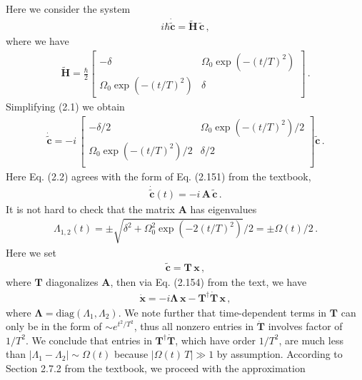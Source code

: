 \documentclass[11pt, oneside]{book}
\theoremstyle{break}
\theoremstyle{break}
\newcommand{\that}[1]{\widetilde{#1}}
\newcommand{\bmat}[1]{\begin{bmatrix} #1 \end{bmatrix}}
\begin{document}
\chapter{}
Here we consider the system
\begin{align}
i\hbar \dot{\that{\mathbf{c}}} = \that{\mathbf{H}}\,\that{\mathbf{c}}\,,
\end{align}
where we have
\begin{align*}
\that{\mathbf{H}} = \frac{\hbar}{2}\bmat{-\delta & \Omega_0 \exp(-(t/T)^2) \\ \Omega_0 \exp(-(t/T)^2) &\delta}\,.
\end{align*}
Simplifying (2.1) we obtain
\begin{align}
 \dot{\that{\mathbf{c}}} =
-i \,\bmat{
-\delta/2 & \Omega_0 \exp(-(t/T)^2) /2\\
\Omega_0 \exp(-(t/T)^2)/2 & \delta/2\\
}
\that{\mathbf{c}}\,.
\end{align}
Here Eq. (2.2) agrees with the form of Eq. (2.151) from the textbook, 
\begin{align*}
\dot{\that{\mathbf{c}}}(t) = -i\, \mathbf{A}\, \mathbf{\that{c}}\,. 
\end{align*}
It is not hard to check that the matrix $\mathbf{A}$ has eigenvalues
\begin{align*}
\Lambda_{1,2}(t) = \pm \sqrt{\delta^2 + \Omega_0^2\exp(-2(t/T)^2)}/2 = \pm \Omega(t)/2\,.
\end{align*}
Here we set
\begin{align}
\mathbf{\that{c}} = \mathbf{T}\,\mathbf{x}\,,
\end{align}
where $\mathbf{T}$ diagonalizes $\mathbf{A}$, then via Eq. (2.154) from the text, we have
\begin{align*}
\dot{\mathbf{x}} = -i \mathbf{\Lambda}\, \mathbf{x} - \mathbf{T}^\dagger \dot{\mathbf{T}}\, \mathbf{x}\,,
\end{align*}
where $\mathbf{\Lambda} = \text{diag}(\Lambda_1, \Lambda_2)$. We note further that time-dependent terms in $\mathbf{T}$ can only be in the form of $\sim e^{ t^2/T^2}$, thus all nonzero entries in $\dot{\mathbf{T}}$ involves factor of $1/T^2$. We conclude that entries in $\mathbf{T}^\dagger \dot{\mathbf{T}}$, which have order $1/T^2$, are much less than $|\Lambda_1 - \Lambda_2|\sim \Omega(t)$ because $|\Omega(t) \, T| \gg 1$ by assumption. According to Section 2.7.2 from the textbook, we proceed with the approximation
\end{document}
